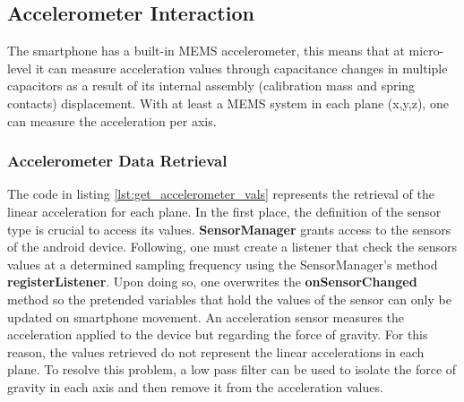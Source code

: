 \subsection{Accelerometer Interaction}%
\label{sec:accelerometer-access}
%
The smartphone has a built-in MEMS accelerometer, this means that at micro-level it can measure acceleration values through capacitance changes in multiple capacitors as a result of its internal assembly (calibration mass and spring contacts) displacement. With at least a MEMS system in each plane (x,y,z), one can measure the acceleration per axis. 
\subsubsection{Accelerometer Data Retrieval}
\label{sec:accelerometer-data}
%
The code in listing \ref{lst:get_accelerometer_vals} represents the retrieval of the linear acceleration for each plane.
In the first place, the definition of the sensor type is crucial to access its values. \textbf{SensorManager} grants access to the sensors of the android device. Following, one must create a listener that check the sensors values at a determined sampling frequency using the SensorManager's method \textbf{registerListener}. Upon doing so, one overwrites the \textbf{onSensorChanged} method so the pretended variables that hold the values of the sensor can only be updated on smartphone movement.
An acceleration sensor measures the acceleration applied to the device but regarding the force of gravity. For this reason, the values retrieved do not represent the linear accelerations in each plane. To resolve this problem, a low pass filter can be used to isolate the force of gravity in each axis and then remove it from the acceleration values.

%
%